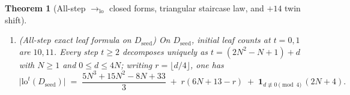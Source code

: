 \documentclass[11pt,reqno]{amsart}
\numberwithin{equation}{section}
\theoremstyle{plain}
\newtheorem{theorem}{Theorem}[section]
\theoremstyle{definition}
\theoremstyle{remark}
\newcommand{\SN}{\mathrm{SN}}
\newcommand{\HN}{\mathrm{HN}}
\newcommand{\sem}[1]{\llbracket #1 \rrbracket}
\begin{document}
\begin{theorem}[All-step $\to_{\mathrm{lo}}$ closed forms, triangular staircase law, and $+14$ twin shift]
\begin{enumerate}[label=(\roman*),leftmargin=2.2em]
\[\begin{cases}
\end{cases}
\]
with exact cubic leaf count
\begin{equation}
\label{eq:w2-cubic-leaves}
\bigl|\mathrm{lo}^t(W_2)\bigr|
\;=\; \frac{4n^3 + 51n^2 + 197n + 138}{6} \;+\; \delta_{W_2}(n, r),
\end{equation}
for $\delta_{W_2}(n, 0) = 0$, $\delta_{W_2}(n, 1) = 2n + 7$, $\delta_{W_2}(n, 2) = 4n + 16$, and $\delta_{W_2}(n, j + 3) = (8n + 33) + j(2n + 9)$. Furthermore, the $12$-leaf twin $W_2^{\mathrm{twin}} \equiv E_0 E_0$ shares identical $(\mathcal{A}_{\SN}, \mathcal{A}_P)$ evaluations $(\infty_{\SN}, \infty_P)$ and order-$1$ solvability ($\sem{W_2}_{\HN} = q_{24}$, $\sem{W_2^{\mathrm{twin}}}_{\HN} = q_{23}$) with $W_2$, satisfies $W_2 \neq_S W_2^{\mathrm{twin}}$, yet obeys for every $t \ge 3$ the exact constant-offset identity
\begin{equation}
\label{eq:w2-twin-shift-14}
\bigl|\mathrm{lo}^{t+1}(W_2)\bigr| + 14 \;=\; \bigl|\mathrm{lo}^t(W_2^{\mathrm{twin}})\bigr|.
\end{equation}
\item \emph{(All-step exact leaf formula on $D_{\mathrm{seed}}$)} On $D_{\mathrm{seed}}$, initial leaf counts at $t = 0, 1$ are $10, 11$. Every step $t \ge 2$ decomposes uniquely as $t = (2N^2 - N + 1) + d$ with $N \ge 1$ and $0 \le d \le 4N$; writing $r = \lfloor d / 4 \rfloor$, one has
\begin{equation}
\label{eq:seed-cubic-leaves}
\bigl|\mathrm{lo}^t(D_{\mathrm{seed}})\bigr|
\;=\; \frac{5N^3 + 15N^2 - 8N + 33}{3} \;+\; r(6N + 13 - r) \;+\; \mathbf{1}_{d \not\equiv 0 \pmod{4}}\,(2N + 4).
\end{equation}
\end{enumerate}
\end{theorem}
\end{document}

